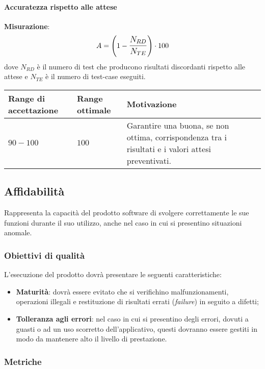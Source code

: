 \paragraph{Accuratezza rispetto alle attese}

\textbf{Misurazione}: 
		$$A=\left(1-\mathlarger{\frac{N_{RD}}{N_{TE}}}\right) \cdot 100$$
	dove $N_{RD}$ è il numero di test che producono risultati discordanti rispetto alle attese e $N_{TE}$ è il numero di test-case eseguiti.
	
\begin{center}
	\begin{tabular}{|P{2.5cm}|P{2.5cm}|P{6cm}|}
		\hline
			\textbf{Range di accettazione}	& \textbf{Range ottimale} & \textbf{Motivazione} \\
			\hline
			$90 - 100$ & $100$ & Garantire una buona, se non ottima, corrispondenza tra i risultati e i valori attesi preventivati. \\
			\hline
			\end{tabular}
\end{center}	

\subsection{Affidabilità}
Rappresenta la capacità del prodotto software di svolgere correttamente le sue funzioni durante il suo utilizzo, anche nel caso in cui si presentino situazioni anomale.

\subsubsection{Obiettivi di qualità}
L'esecuzione del prodotto dovrà presentare le seguenti caratteristiche:
\begin{itemize}
\item \textbf{Maturità}: dovrà essere evitato che si verifichino malfunzionamenti, operazioni illegali e restituzione di risultati errati (\textit{failure}) in seguito a difetti;
\item \textbf{Tolleranza agli errori}: nel caso in cui si presentino degli errori, dovuti a guasti o ad un uso scorretto dell'applicativo, questi dovranno essere gestiti in modo da mantenere alto il livello di prestazione.
\end{itemize}

\subsubsection{Metriche}


